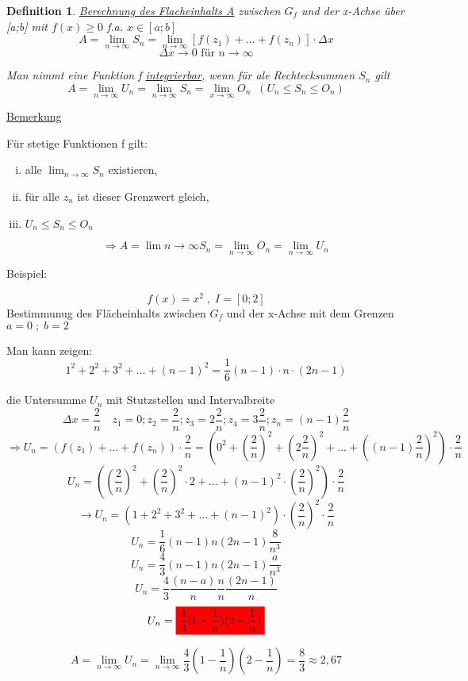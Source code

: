 \documentclass{article}
\newcommand{\mathcolorbox}[2]{\colorbox{#1}{$\displaystyle #2$}}
\newtheorem{definition}{Definition}
\begin{document}
\begin{definition} \underline{Berechnung des Flacheinhalts A} zwischen $G_f$ und der x-Achse über [a;b] mit $f(x) \geq 0$ f.a. $x \in [a; b]$
\[A = \lim_{n\to \infty} S_n = \lim_{n\to \infty} [f(z_1) + \dotsc + f(z_n)]\cdot \Delta x\]
\[\Delta x \to 0\text{ für }n \to \infty\]

Man nimmt eine Funktion f \underline{integrierbar}, wenn für ale Rechtecksummen $S_n$ gilt 
\[ A = \lim_{n\to \infty}U_n = \lim_{n\to \infty} S_n = \lim_{x\to \infty} O_n \; \; (U_n \leq S_n \leq O_n) \]

\end{definition}

\underline{Bemerkung}

Für stetige Funktionen f gilt: 
\begin{enumerate}[i)]
\item alle $\lim_{n\to \infty} S_n$ existieren,
\item für alle $z_n $ ist dieser Grenzwert gleich,
\item $U_n \leq S_n \leq O_n$

\[ \Rightarrow A = \lim{n\to \infty} S_n = \lim_{n\to \infty} O_n = \lim_{n\to \infty} U_n\]
\end{enumerate}

Beispiel:

\[f(x) = x^2 \;, \; I = [0;2]\]
Bestimmunug des Flächeinhalts zwischen $G_f$ und der x-Achse mit dem Grenzen $ a=0 \; ; \; b = 2$

Man kann zeigen: 
\[1^2+2^2+3^2 + \dots + (n-1)^2 = \frac 16(n-1)\cdot n \cdot (2n-1)\]

die Untersumme $U_n $ mit Stutzstellen und Intervalbreite
\[\Delta x = \frac 2n \quad z_1 = 0 ; z_2 = \frac 2 n ; z_3 = 2\frac 2 n ; z_4 =3\frac 2 n ; z_n = (n-1)\frac 2n\]
\[\Rightarrow U_n = (f(z_1) + \dotsc + f(z_n))\cdot \frac 2 n = (0^2 + (\frac 2n)^2 + (2\frac 2n)^2 + \dotsc + ((n-1)\frac 2n)^2)\cdot \frac 2n\]
\[ U_n = ((\frac 2n)^2+(\frac 2n)^2\cdot 2 + \dotsc + (n-1)^2\cdot (\frac 2n)^2)\cdot \frac 2n\]
\[\rightarrow U_n = (1+2^2 + 3^2 + \dotsc + (n-1)^2 ) \cdot (\frac 2n)^2\cdot \frac 2n\]
\[U_n = \frac 16 (n-1)n(2n-1) \frac 8 {n^3}\]
\[U_n = \frac 43 (n-1) n (2n-1)\frac a{n^3}\]
\[U_n = \frac 43 \frac{(n-a)}n \frac nn \frac {(2n-1)}n\]
\[U_n= \mathcolorbox{red}{\frac 43 (1-\frac1n)(2-\frac1n)}\]

\[A = \lim_{n\to\infty}U_n = \lim_{n\to\infty}\frac 43 (1-\frac 1n)(2-\frac 1n) = \frac 83\approx 2,67\]
\end{document}
